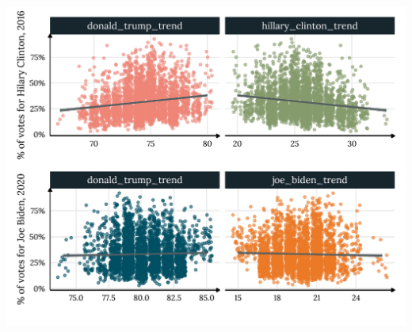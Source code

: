 \documentclass[
]{article}
\begin{document}
\begin{center}\includegraphics[width=0.8\linewidth]{paper1_files/figure-latex/pres_plot-1} \end{center}
\end{document}
